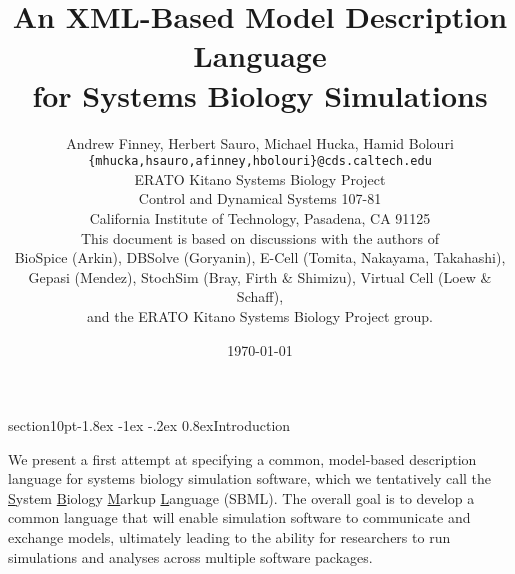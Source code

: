 \documentclass[10pt]{article}
\makeatletter
\renewcommand{\section}{\@startsection%
  {section}{1}{0pt}{-1.8ex \@plus -1ex \@minus -.2ex}%
  {0.8ex}{\normalfont\Large\bfseries}}
\makeatother
\begin{document}


\title{\textbf{An XML-Based Model Description Language\\
    for Systems Biology Simulations}}

\author{Andrew Finney, Herbert Sauro, Michael Hucka, Hamid Bolouri\\
\normalsize\texttt{\{mhucka,hsauro,afinney,hbolouri\}@cds.caltech.edu}\\[-2pt]
\normalsize ERATO Kitano Systems Biology Project\\[-2pt]
\normalsize Control and Dynamical Systems 107-81\\[-2pt]
\normalsize California Institute of Technology, Pasadena, CA 91125\\[10pt]
\normalsize This document is based on discussions with the authors of\\[-2pt]
\normalsize BioSpice (Arkin), DBSolve (Goryanin), E-Cell (Tomita, Nakayama, Takahashi),\\[-2pt]
\normalsize Gepasi (Mendez), StochSim (Bray, Firth \& Shimizu), Virtual Cell (Loew \& Schaff),\\[-2pt]
\normalsize and the ERATO Kitano Systems Biology Project group.}

\date{\today{}}

\maketitle

\vspace*{0.5 in}

\section{Introduction}
\label{sec:introduction}

We present a first attempt at specifying a common, model-based
description language for systems biology simulation software,
which we tentatively call the \underline{S}ystem
\underline{B}iology \underline{M}arkup \underline{L}anguage
(SBML). The overall goal is to develop a common language that
will enable simulation software to communicate and exchange
models, ultimately leading to the ability for researchers to run
simulations and analyses across multiple software packages.
\end{document}
